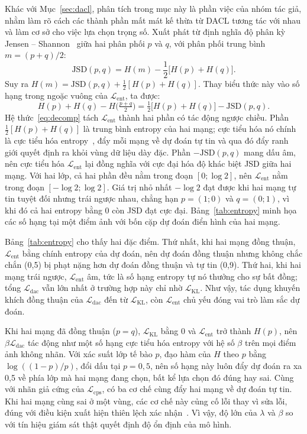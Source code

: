 \documentclass{IEEEtran}
\newcommand{\Lx}[1]{\mathcal{L}_{\mathrm{#1}}}
\newcommand{\JSD}{\mathrm{JSD}}
\begin{document}
Khác với Mục~\ref{sec:dacl}, phân tích trong mục này là phần việc của nhóm tác giả, nhằm làm rõ cách các thành phần mất mát kế thừa từ DACL tương tác với nhau và làm cơ sở cho việc lựa chọn trọng số. Xuất phát từ định nghĩa độ phân kỳ Jensen -- Shannon~\cite{jsd} giữa hai phân phối $p$ và $q$, với phân phối trung bình $m=(p+q)/2$:
\begin{equation}
  \JSD(p, q) = H(m) - \frac{1}{2}\big[H(p)+H(q)\big]. \label{eq:jsd}
\end{equation}
Suy ra $H(m)=\JSD(p,q)+\tfrac12[H(p)+H(q)]$. Thay biểu thức này vào số hạng trong ngoặc vuông của $\Lx{ent}$, ta được:
\begin{equation}
  H(p)+H(q)-H\big(\tfrac{p+q}{2}\big) = \tfrac{1}{2}\big[H(p)+H(q)\big] - \JSD(p, q). \label{eq:decomp}
\end{equation}
Hệ thức~\eqref{eq:decomp} tách $\Lx{ent}$ thành hai phần có tác động ngược chiều. Phần $\tfrac12[H(p)+H(q)]$ là trung bình entropy của hai mạng; cực tiểu hóa nó chính là cực tiểu hóa entropy~\cite{entmin}, đẩy mỗi mạng về dự đoán tự tin và qua đó đẩy ranh giới quyết định ra khỏi vùng dữ liệu dày đặc. Phần $-\JSD(p,q)$ mang dấu âm, nên cực tiểu hóa $\Lx{ent}$ lại đồng nghĩa với cực đại hóa độ khác biệt JSD giữa hai mạng. Với hai lớp, cả hai phần đều nằm trong đoạn $[0;\log 2]$, nên $\Lx{ent}$ nằm trong đoạn $[-\log 2;\log 2]$. Giá trị nhỏ nhất $-\log 2$ đạt được khi hai mạng tự tin tuyệt đối nhưng trái ngược nhau, chẳng hạn $p=(1;0)$ và $q=(0;1)$, vì khi đó cả hai entropy bằng 0 còn JSD đạt cực đại. Bảng~\ref{tab:entropy} minh họa các số hạng tại một điểm ảnh với bốn cặp dự đoán điển hình của hai mạng.



Bảng~\ref{tab:entropy} cho thấy hai đặc điểm. Thứ nhất, khi hai mạng đồng thuận, $\Lx{ent}$ bằng chính entropy của dự đoán, nên dự đoán đồng thuận nhưng không chắc chắn (0,5) bị phạt nặng hơn dự đoán đồng thuận và tự tin (0,9). Thứ hai, khi hai mạng trái ngược, $\Lx{ent}$ âm, tức là số hạng entropy tự nó thưởng cho sự bất đồng; tổng $\Lx{dac}$ vẫn lớn nhất ở trường hợp này chỉ nhờ $\Lx{KL}$. Như vậy, tác dụng khuyến khích đồng thuận của $\Lx{dac}$ đến từ $\Lx{KL}$, còn $\Lx{ent}$ chủ yếu đóng vai trò làm sắc dự đoán.

Khi hai mạng đã đồng thuận ($p=q$), $\Lx{KL}$ bằng 0 và $\Lx{ent}$ trở thành $H(p)$, nên $\beta\Lx{dac}$ tác động như một số hạng cực tiểu hóa entropy với hệ số $\beta$ trên mọi điểm ảnh không nhãn. Với xác suất lớp tế bào $p$, đạo hàm của $H$ theo $p$ bằng $\log((1-p)/p)$, đổi dấu tại $p=0{,}5$, nên số hạng này luôn đẩy dự đoán ra xa 0,5 về phía lớp mà hai mạng đang chọn, bất kể lựa chọn đó đúng hay sai. Cùng với nhãn giả cứng của $\Lx{cps}$, có ba cơ chế cùng đẩy hai mạng về dự đoán tự tin. Khi hai mạng cùng sai ở một vùng, các cơ chế này củng cố lỗi thay vì sửa lỗi, đúng với điều kiện xuất hiện thiên lệch xác nhận~\cite{confirm}. Vì vậy, độ lớn của $\lambda$ và $\beta$ so với tín hiệu giám sát thật quyết định độ ổn định của mô hình.
\end{document}
